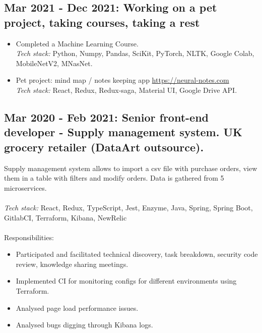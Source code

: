 \documentclass[a4paper, 14pt]{article}
\begin{document}
  \subsection{Mar 2021 - Dec 2021: Working on a pet project, taking courses, taking a rest}

    \begin{itemize}
      \item Completed a Machine Learning Course. \\
      \textit{Tech stack:} Python, Numpy, Pandas, SciKit, PyTorch, NLTK, Google Colab, MobileNetV2, MNasNet. \\
      \item Pet project: mind map / notes keeping app \url{https://neural-notes.com} \\
      \textit{Tech stack:} React, Redux, Redux-saga, Material UI, Google Drive API.
    \end{itemize}
  \bigskip

  \subsection{Mar 2020 - Feb 2021: Senior front-end developer - Supply management system. UK grocery retailer (DataArt outsource).}
  Supply management system allows to import a csv file with purchase orders, view them in a table with filters and modify orders. Data is gathered from 5 microservices. \\
  \\
  \textit{Tech stack:} React, Redux, TypeScript, Jest, Enzyme, Java, Spring, Spring Boot, GitlabCI, Terraform, Kibana, NewRelic \\
  \\
  Responsibilities:
    \begin{itemize}
      \item Participated and facilitated technical discovery, task breakdown, security code review, knowledge sharing meetings. \\
      \item Implemented CI for monitoring configs for different environments using Terraform. \\
      \item Analysed page load performance issues. \\
      \item Analysed bugs digging through Kibana logs. \\
    \end{itemize}
\end{document}
